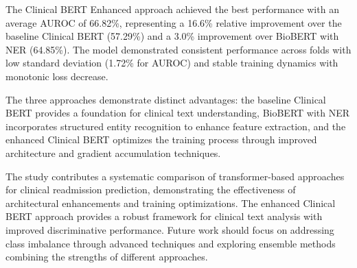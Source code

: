 \documentclass[11pt,a4paper]{article}
\begin{document}
The Clinical BERT Enhanced approach achieved the best performance with an average AUROC of 66.82\%, representing a 16.6\% relative improvement over the baseline Clinical BERT (57.29\%) and a 3.0\% improvement over BioBERT with NER (64.85\%). The model demonstrated consistent performance across folds with low standard deviation (1.72\% for AUROC) and stable training dynamics with monotonic loss decrease.

The three approaches demonstrate distinct advantages: the baseline Clinical BERT provides a foundation for clinical text understanding, BioBERT with NER incorporates structured entity recognition to enhance feature extraction, and the enhanced Clinical BERT optimizes the training process through improved architecture and gradient accumulation techniques.

The study contributes a systematic comparison of transformer-based approaches for clinical readmission prediction, demonstrating the effectiveness of architectural enhancements and training optimizations. The enhanced Clinical BERT approach provides a robust framework for clinical text analysis with improved discriminative performance. Future work should focus on addressing class imbalance through advanced techniques and exploring ensemble methods combining the strengths of different approaches.
\end{document}
